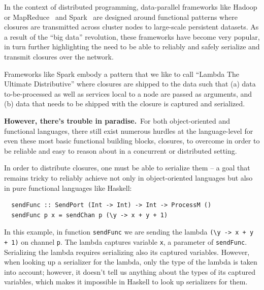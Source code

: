\documentclass{llncs}
\begin{document}

In the context of distributed programming, data-parallel frameworks like
Hadoop or MapReduce~\cite{MapReduce} and Spark~\cite{Spark} are designed
around functional patterns where closures are
transmitted across cluster nodes to large-scale persistent datasets. As a result of the ``big data'' revolution,
these frameworks have become very popular, in turn further highlighting the
need to be able to reliably and safely serialize and transmit closures over
the network.


Frameworks like Spark embody a pattern that we like to call ``Lambda The
Ultimate Distributive'' where closures are shipped to the data such that (a)
data to-be-processed as well as services local
to a node are passed as arguments, and (b) data that needs to
be shipped with the closure is captured and serialized.


{\bf However, there's trouble in paradise.}~For both object-oriented and
functional languages, there still exist numerous hurdles at the language-level
for even these most basic functional building blocks, closures, to overcome in
order to be reliable and easy to reason about in a concurrent or distributed
setting.

In order to distribute closures, one must be able to serialize them -- a goal
that remains tricky to reliably achieve not only in object-oriented
languages but also in pure functional languages like Haskell:

\begin{lstlisting}
  sendFunc :: SendPort (Int -> Int) -> Int -> ProcessM ()
  sendFunc p x = sendChan p (\y -> x + y + 1)
\end{lstlisting}
\noindent
In this example, in function \verb|sendFunc| we are sending the lambda \verb|(\y -> x + y + 1)| on channel \verb|p|. The lambda captures variable \verb|x|, a parameter of \verb|sendFunc|. Serializing the lambda requires serializing also its captured variables. However, when looking up a serializer for the lambda, only the type of the lambda is taken into account; however, it doesn't tell us anything about the types of its captured variables, which makes it impossible in Haskell to look up serializers for them.
\end{document}
